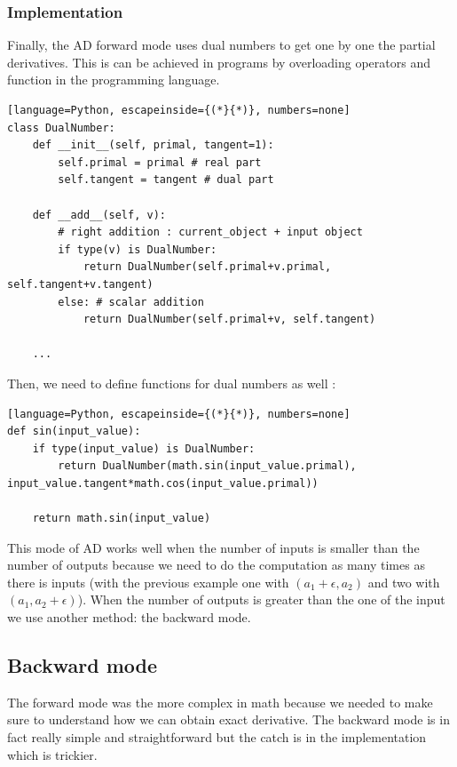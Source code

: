 \documentclass[12pt]{article}
\begin{document}
\subsubsection{Implementation}

Finally, the AD forward mode uses dual numbers to get one by one the partial derivatives. This is can be achieved in programs by overloading operators and function in the programming language.

\begin{lstlisting}[language=Python, escapeinside={(*}{*)}, numbers=none]
class DualNumber:
    def __init__(self, primal, tangent=1):
        self.primal = primal # real part
        self.tangent = tangent # dual part
    
    def __add__(self, v):
        # right addition : current_object + input object
        if type(v) is DualNumber:
            return DualNumber(self.primal+v.primal, self.tangent+v.tangent)
        else: # scalar addition
            return DualNumber(self.primal+v, self.tangent)
    
    ...
\end{lstlisting}

Then, we need to define functions for dual numbers as well  : 


\begin{lstlisting}[language=Python, escapeinside={(*}{*)}, numbers=none]
def sin(input_value):
    if type(input_value) is DualNumber:
        return DualNumber(math.sin(input_value.primal), input_value.tangent*math.cos(input_value.primal))
    
    return math.sin(input_value)
\end{lstlisting}


This mode of AD works well when the number of inputs is smaller than the number of outputs because we need to do the computation as many times as there is inputs (with the previous example one with $(a_1 + \epsilon, a_2)$ and two with $(a_1, a_2+\epsilon)$). When the number of outputs is greater than the one of the input we use another method: the backward mode.


\subsection{Backward mode}

The forward mode was the more complex in math because we needed to make sure to understand how we can obtain exact derivative. The backward mode is in fact really simple and straightforward but the catch is in the implementation which is trickier. 
\end{document}
